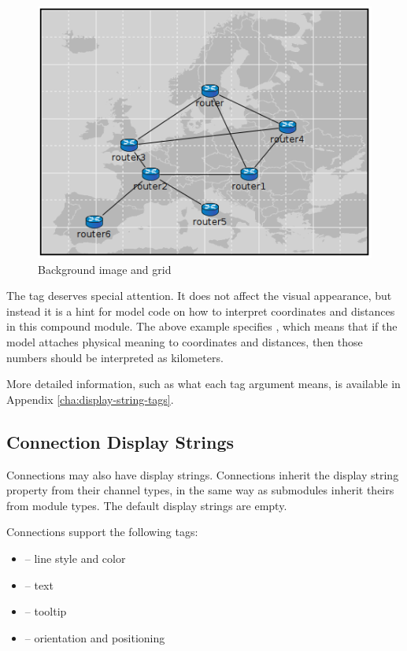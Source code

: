 \begin{figure}[htbp]
  \begin{center}
    \includegraphics{figures/graphics-bgtags}
    \caption{Background image and grid}
    \label{fig:graphics-bgtags}
  \end{center}
\end{figure}

The  tag deserves special attention. It does not affect
the visual appearance, but instead it is a hint for model code
on how to interpret coordinates and distances in this compound
module. The above example specifies , which means
that if the model attaches physical meaning to coordinates and
distances, then those numbers should be interpreted as kilometers.

More detailed information, such as what each tag argument means, is
available in Appendix \ref{cha:display-string-tags}.


\subsection{Connection Display Strings}

Connections may also have display strings. Connections inherit the
display string property from their channel types, in the same way as
submodules inherit theirs from module types. The default display
strings are empty.

Connections support the following tags:
\begin{itemize}
  \item{ -- line style and color}
  \item{ -- text}
  \item{ -- tooltip}
  \item{ -- orientation and positioning}
\end{itemize}

